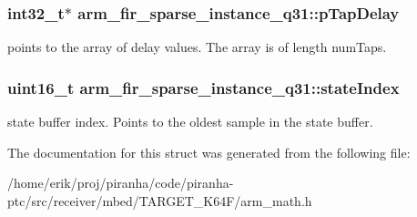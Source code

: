 \subsubsection[{\texorpdfstring{p\+Tap\+Delay}{pTapDelay}}]{\setlength{\rightskip}{0pt plus 5cm}int32\+\_\+t$\ast$ arm\+\_\+fir\+\_\+sparse\+\_\+instance\+\_\+q31\+::p\+Tap\+Delay}\hypertarget{structarm__fir__sparse__instance__q31_ab87ae457adec8f727afefaa2599fc983}{}\label{structarm__fir__sparse__instance__q31_ab87ae457adec8f727afefaa2599fc983}
points to the array of delay values. The array is of length num\+Taps. 
\subsubsection[{\texorpdfstring{state\+Index}{stateIndex}}]{\setlength{\rightskip}{0pt plus 5cm}uint16\+\_\+t arm\+\_\+fir\+\_\+sparse\+\_\+instance\+\_\+q31\+::state\+Index}\hypertarget{structarm__fir__sparse__instance__q31_a557ed9d477e76e4ad2019344f19f568a}{}\label{structarm__fir__sparse__instance__q31_a557ed9d477e76e4ad2019344f19f568a}
state buffer index. Points to the oldest sample in the state buffer. 

The documentation for this struct was generated from the following file\+:\begin{DoxyCompactItemize}
\item 
/home/erik/proj/piranha/code/piranha-\/ptc/src/receiver/mbed/\+T\+A\+R\+G\+E\+T\+\_\+\+K64\+F/arm\+\_\+math.\+h\end{DoxyCompactItemize}
